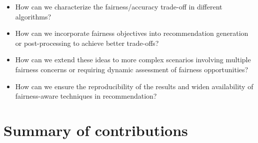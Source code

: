 \begin{itemize}
    \item How can we characterize the fairness/accuracy trade-off in different algorithms?
    \item How can we incorporate fairness objectives into recommendation generation or post-processing to achieve better trade-offs? %
    \item How can we extend these ideas to more complex scenarios involving multiple fairness concerns or requiring dynamic assessment of fairness opportunities? %
    \item How can we ensure the reproducibility of the results and widen availability of fairness-aware techniques in recommendation? %
\end{itemize}

\section{Summary of contributions}














